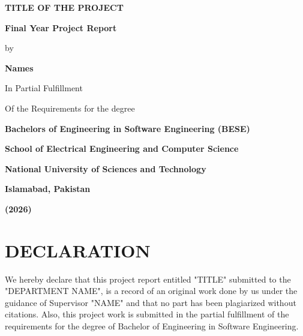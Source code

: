 \documentclass[12pt, a4paper]{report}
\begin{document}
\begin{titlepage}
    \centering
    \vspace*{1in}
    
    {\Huge \bfseries TITLE OF THE PROJECT\par}
    
    \vspace{1.5in}
    
    {\Large \bfseries Final Year Project Report \par}
    \vspace{0.2in}
    {\large by \par}
    \vspace{0.2in}
    {\large \bfseries Names \par}
    
    \vspace{1.5in}
    
    {\large In Partial Fulfillment \par}
    {\large Of the Requirements for the degree \par}
    {\large \bfseries Bachelors of Engineering in Software Engineering (BESE) \par}
    
    \vfill
    
    {\large \bfseries School of Electrical Engineering and Computer Science \par}
    {\large \bfseries National University of Sciences and Technology \par}
    {\large \bfseries Islamabad, Pakistan \par}
    {\large \bfseries (2026) \par}
    
\end{titlepage}


\chapter*{DECLARATION}
We hereby declare that this project report entitled "TITLE" submitted to the "DEPARTMENT NAME", is a record of an original work done by us under the guidance of Supervisor "NAME" and that no part has been plagiarized without citations. Also, this project work is submitted in the partial fulfillment of the requirements for the degree of Bachelor of Engineering in Software Engineering.
\end{document}
